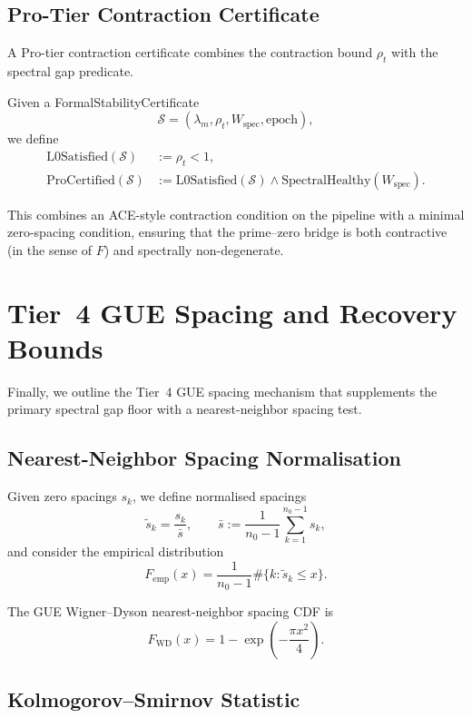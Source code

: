 \documentclass[11pt]{article}
\begin{document}
\subsection{Pro-Tier Contraction Certificate}

A Pro-tier contraction certificate combines the contraction bound
$\rho_t$ with the spectral gap predicate.

\begin{definition}
Given a FormalStabilityCertificate
\[
  \mathcal{S} = (\lambda_m,\rho_t,W_{\mathrm{spec}},\mathrm{epoch}),
\]
we define
\begin{align*}
  \mathrm{L0Satisfied}(\mathcal{S})
  &:= \rho_t < 1,\\
  \mathrm{ProCertified}(\mathcal{S})
  &:= \mathrm{L0Satisfied}(\mathcal{S})
      \wedge \mathrm{SpectralHealthy}(W_{\mathrm{spec}}).
\end{align*}
\end{definition}

This combines an ACE-style contraction condition on the pipeline with a
minimal zero-spacing condition, ensuring that the prime--zero bridge is
both contractive (in the sense of $F$) and spectrally non-degenerate.

\section{Tier~4 GUE Spacing and Recovery Bounds}

Finally, we outline the Tier~4 GUE spacing mechanism that supplements
the primary spectral gap floor with a nearest-neighbor spacing test.

\subsection{Nearest-Neighbor Spacing Normalisation}

Given zero spacings $s_k$, we define normalised spacings
\[
  \tilde{s}_k = \frac{s_k}{\bar{s}},\qquad
  \bar{s} := \frac{1}{n_0-1}\sum_{k=1}^{n_0-1} s_k,
\]
and consider the empirical distribution
\[
  F_{\mathrm{emp}}(x) = \frac{1}{n_0-1}
  \#\{k : \tilde{s}_k \le x\}.
\]

The GUE Wigner–Dyson nearest-neighbor spacing CDF is
\[
  F_{\mathrm{WD}}(x) = 1 - \exp\left(-\frac{\pi x^2}{4}\right).
\]

\subsection{Kolmogorov–Smirnov Statistic}
\end{document}
